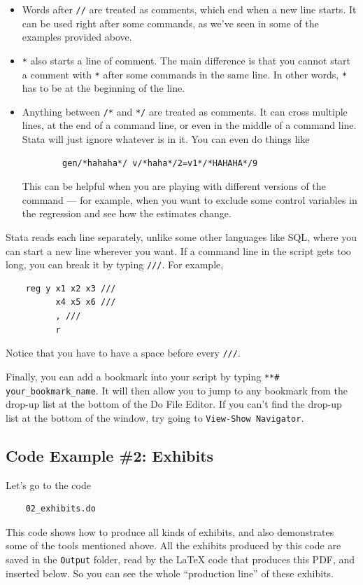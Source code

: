 \begin{itemize}
    \item Words after \verb|//| are treated as comments, which end when a new line starts. It can be used right after some commands, as we've seen in some of the examples provided above. 
    \item \verb|*| also starts a line of comment. The main difference is that you cannot start a comment with \verb|*| after some commands in the same line. In other words, \verb|*| has to be at the beginning of the line. 
    \item Anything between \verb|/*| and \verb|*/| are treated as comments. It can cross multiple lines, at the end of a command line, or even in the middle of a command line. Stata will just ignore whatever is in it. You can even do things like
    \begin{verbatim}
        gen/*hahaha*/ v/*haha*/2=v1*/*HAHAHA*/9
    \end{verbatim}
    This can be helpful when you are playing with different versions of the command --- for example, when you want to exclude some control variables in the regression and see how the estimates change.     
\end{itemize}

Stata reads each line separately, unlike some other languages like SQL, where you can start a new line wherever you want. If a command line in the script gets too long, you can break it by typing \verb|///|. For example, 
\begin{verbatim}
    reg y x1 x2 x3 ///
          x4 x5 x6 ///
          , ///
          r
\end{verbatim}
Notice that you have to have a space before every \verb|///|. 

Finally, you can add a bookmark into your script by typing \verb|**# your_bookmark_name|. It will then allow you to jump to any bookmark from the drop-up list at the bottom of the Do File Editor. If you can't find the drop-up list at the bottom of the window, try going to \verb|View-Show Navigator|.

\subsection{Code Example \#2: Exhibits}
Let's go to the code
\begin{verbatim}
    02_exhibits.do
\end{verbatim}
This code shows how to produce all kinds of exhibits, and also demonstrates some of the tools mentioned above. All the exhibits produced by this code are saved in the \verb|Output| folder, read by the {\LaTeX} code that produces this PDF, and inserted below. So you can see the whole ``production line'' of these exhibits. 

